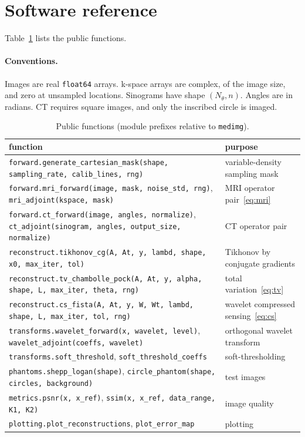 \documentclass[11pt,a4paper]{article}
\newcommand{\code}[1]{\texttt{#1}}
\begin{document}
\section{Software reference}

Table~\ref{tab:api} lists the public functions.

\paragraph{Conventions.} Images are real \code{float64} arrays. k-space
arrays are complex, of the image size, and zero at unsampled locations.
Sinograms have shape $(N_\theta, n)$. Angles are in radians. CT requires
square images, and only the inscribed circle is imaged.

\begin{table}[ht]
\centering
\small
\caption{Public functions (module prefixes relative to \code{medimg}).}
\label{tab:api}
\begin{tabular}{@{}p{}p{}@{}}
\toprule
function & purpose \\
\midrule
\code{forward.generate\_cartesian\_mask(shape, sampling\_rate, calib\_lines, rng)}
  & variable-density sampling mask \\
\code{forward.mri\_forward(image, mask, noise\_std, rng)},
\code{mri\_adjoint(kspace, mask)} & MRI operator pair~\eqref{eq:mri} \\
\code{forward.ct\_forward(image, angles, normalize)},
\code{ct\_adjoint(sinogram, angles, output\_size, normalize)}
  & CT operator pair \\
\code{reconstruct.tikhonov\_cg(A, At, y, lambd, shape, x0, max\_iter, tol)}
  & Tikhonov by conjugate gradients \\
\code{reconstruct.tv\_chambolle\_pock(A, At, y, alpha, shape, L, max\_iter, theta, rng)}
  & total variation~\eqref{eq:tv} \\
\code{reconstruct.cs\_fista(A, At, y, W, Wt, lambd, shape, L, max\_iter, tol, rng)}
  & wavelet compressed sensing~\eqref{eq:cs} \\
\code{transforms.wavelet\_forward(x, wavelet, level)},
\code{wavelet\_adjoint(coeffs, wavelet)} & orthogonal wavelet transform \\
\code{transforms.soft\_threshold}, \code{soft\_threshold\_coeffs}
  & soft-thresholding \\
\code{phantoms.shepp\_logan(shape)}, \code{circle\_phantom(shape, circles, background)}
  & test images \\
\code{metrics.psnr(x, x\_ref)}, \code{ssim(x, x\_ref, data\_range, K1, K2)}
  & image quality \\
\code{plotting.plot\_reconstructions}, \code{plot\_error\_map} & plotting \\
\bottomrule
\end{tabular}
\end{table}
\end{document}
